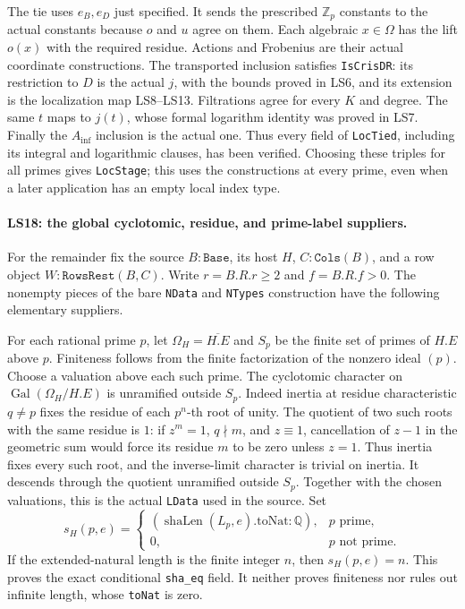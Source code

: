 The tie uses $e_B,e_D$ just specified. It sends the prescribed
$\mathbb Z_p$ constants to the actual constants because $o$
and $u$ agree on them. Each algebraic $x\in\Omega$ has the
lift $o(x)$ with the required residue. Actions and Frobenius
are their actual coordinate constructions. The transported
inclusion satisfies \texttt{IsCrisDR}: its restriction to $D$
is the actual $j$, with the bounds proved in LS6, and its
extension is the localization map LS8--LS13. Filtrations agree
for every $K$ and degree. The same $t$ maps to $j(t)$, whose
formal logarithm identity was proved in LS7. Finally the
$A_{\inf}$ inclusion is the actual one. Thus every field of
\texttt{LocTied}, including its integral and logarithmic clauses,
has been verified. Choosing these triples for all primes gives
\texttt{LocStage}; this uses the constructions at every prime,
even when a later application has an empty local index type.

\paragraph{LS18: the global cyclotomic, residue, and prime-label suppliers.}
For the remainder fix the source $B:\texttt{Base}$, its host $H$,
$C:\texttt{Cols}(B)$, and a row object $W:\texttt{RowsRest}(B,C)$.
Write $r=B.R.r\ge2$ and $f=B.R.f>0$.
The nonempty pieces of the bare \texttt{NData} and \texttt{NTypes}
construction have the following elementary suppliers.

For each rational prime $p$, let $\Omega_H=\overline{H.E}$ and
$S_p$ be the finite set of primes of $H.E$ above $p$.
Finiteness follows from the finite factorization of the nonzero
ideal $(p)$. Choose a valuation above each such prime.
The cyclotomic character on
$\operatorname{Gal}(\Omega_H/H.E)$ is unramified outside $S_p$.
Indeed inertia at residue characteristic $q\ne p$ fixes the
residue of each $p^n$-th root of unity. The quotient of two such
roots with the same residue is $1$: if $z^m=1$, $q\nmid m$,
and $z\equiv1$, cancellation of $z-1$ in the geometric sum
would force its residue $m$ to be zero unless $z=1$.
Thus inertia fixes every such root, and the inverse-limit
character is trivial on inertia. It descends through the quotient
unramified outside $S_p$. Together with the chosen valuations,
this is the actual \texttt{LData} used in the source. Set
\[
 s_H(p,e)=
 \begin{cases}
  (\operatorname{shaLen}(L_p,e).\mathrm{toNat}:\mathbb Q),
                                      &p\text{ prime},\\
  0,&p\text{ not prime}.
 \end{cases}                                                \tag{LS.42}
\]
If the extended-natural length is the finite integer $n$,
then $s_H(p,e)=n$. This proves the exact conditional
\texttt{sha\_eq} field. It neither proves finiteness nor rules
out infinite length, whose \texttt{toNat} is zero.

